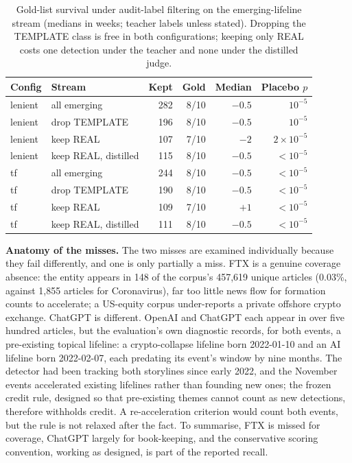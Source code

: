 \documentclass[a4paper,12pt]{report}
\begin{document}
\begin{table}[ht]
\centering
\caption{Gold-list survival under audit-label filtering on the
emerging-lifeline stream (medians in weeks; teacher labels unless
stated). Dropping the TEMPLATE class is free in both configurations;
keeping only REAL costs one detection under the teacher and none under
the distilled judge.}
\label{tab:survival}
\begin{tabular}{llrrrr}
\toprule
Config & Stream & Kept & Gold & Median & Placebo $p$ \\
\midrule
lenient & all emerging & 282 & 8/10 & $-0.5$ & $10^{-5}$ \\
lenient & drop TEMPLATE & 196 & 8/10 & $-0.5$ & $10^{-5}$ \\
lenient & keep REAL & 107 & 7/10 & $-2$ & $2\times10^{-5}$ \\
lenient & keep REAL, distilled & 115 & 8/10 & $-0.5$ & $<10^{-5}$ \\
tf & all emerging & 244 & 8/10 & $-0.5$ & $<10^{-5}$ \\
tf & drop TEMPLATE & 190 & 8/10 & $-0.5$ & $<10^{-5}$ \\
tf & keep REAL & 109 & 7/10 & $+1$ & $<10^{-5}$ \\
tf & keep REAL, distilled & 111 & 8/10 & $-0.5$ & $<10^{-5}$ \\
\bottomrule
\end{tabular}
\end{table}

\textbf{Anatomy of the misses.} The two misses are examined
individually because they fail differently, and one is only partially
a miss. FTX is a genuine coverage
absence: the entity appears in 148 of the corpus's 457{,}619 unique
articles (0.03\%, against 1{,}855 articles for Coronavirus), far too little
news flow for formation counts to accelerate; a US-equity corpus
under-reports a private offshore crypto exchange. ChatGPT is different.
OpenAI and ChatGPT each appear in over five hundred articles, but the
evaluation's own diagnostic records, for both events, a pre-existing
topical lifeline: a crypto-collapse lifeline born 2022-01-10 and an AI
lifeline born 2022-02-07, each predating its event's window by nine months.
The detector had been tracking both storylines since early 2022, and the
November events accelerated existing lifelines rather than founding new
ones; the frozen credit rule, designed so that pre-existing themes
cannot count as new detections, therefore withholds credit. A
re-acceleration criterion would count both events, but the rule is not
relaxed after the fact. To summarise, FTX is missed for coverage,
ChatGPT largely for book-keeping, and the conservative scoring convention,
working as designed, is part of the reported recall.
\end{document}
